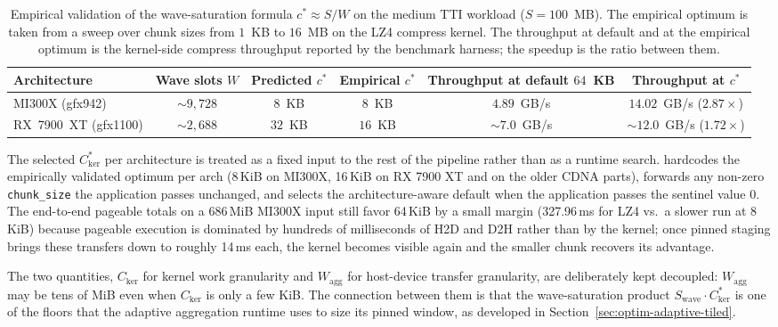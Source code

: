 \begin{table}[t]
\centering
\footnotesize
\caption{Empirical validation of the wave-saturation formula
$c^{*} \approx S / W$ on the medium TTI workload ($S = 100$~MB).
The empirical optimum is taken from a sweep over chunk sizes from
$1$~KB to $16$~MB on the LZ4 compress kernel. The throughput at
default and at the empirical optimum is the kernel-side compress
throughput reported by the \arcto{} benchmark harness; the
speedup is the ratio between them.}
\label{tab:chunk-validation}
\begin{tabular}{lccccc}
\toprule
\textbf{Architecture} & \textbf{Wave slots} $W$ &
\textbf{Predicted} $c^{*}$ & \textbf{Empirical} $c^{*}$ &
\textbf{Throughput at default $64$~KB} & \textbf{Throughput at $c^{*}$} \\
\midrule
MI300X (gfx942)       & $\sim 9{,}728$ & $8$~KB  & $8$~KB  & $4.89$~GB/s     & $14.02$~GB/s ($2.87\times$) \\
RX~7900~XT (gfx1100)  & $\sim 2{,}688$ & $32$~KB & $16$~KB & $\sim 7.0$~GB/s & $\sim 12.0$~GB/s ($1.72\times$) \\
\bottomrule
\end{tabular}
\end{table}

The selected $C_{\text{ker}}^{*}$ per architecture is treated as a
fixed input to the rest of the pipeline rather than as a runtime
search. \arcto{} hardcodes the empirically validated optimum per arch
(8\,KiB on MI300X, 16\,KiB on RX 7900 XT and on the older CDNA
parts), forwards any non-zero \texttt{chunk\_size} the application
passes unchanged, and selects the architecture-aware default when
the application passes the sentinel value $0$. The end-to-end pageable
totals on a 686\,MiB MI300X input still favor 64\,KiB by a small
margin (327.96\,ms for LZ4 vs.\ a slower run at 8\,KiB) because
pageable execution is dominated by hundreds of milliseconds of H2D
and D2H rather than by the kernel; once pinned staging brings these
transfers down to roughly 14\,ms each, the kernel becomes visible
again and the smaller chunk recovers its advantage.

The two quantities, $C_{\text{ker}}$ for kernel work granularity and
$W_{\text{agg}}$ for host-device transfer granularity, are deliberately
kept decoupled: $W_{\text{agg}}$ may be tens of MiB even when
$C_{\text{ker}}$ is only a few KiB. The connection between them is
that the wave-saturation product $S_{\text{wave}} \cdot
C_{\text{ker}}^{*}$ is one of the floors that the adaptive
aggregation runtime uses to size its pinned window, as developed in
Section~\ref{sec:optim-adaptive-tiled}.
